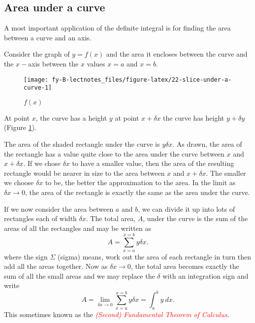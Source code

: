 \documentclass[
  11pt,
  oneside]{book}
\newcommand{\slide}{}
\theoremstyle{definition}
\theoremstyle{definition}
\theoremstyle{definition}
\theoremstyle{definition}
\theoremstyle{remark}
\begin{document}
\slide

\subsection{Area under a curve}\label{area-under-a-curve}

A most important application of the definite integral is for finding the area between a curve and an axis.

Consider the graph of \(y = f(x)\) and the area it encloses between the curve and the \(x-\)axis between the \(x\) values \(x = a\) and \(x = b\).

\begin{figure}

{\centering \texttt{[image: fy-B-lectnotes\_files/figure-latex/22-slice-under-a-curve-1]} 

}

\caption{$f(x)$}\label{fig:22-slice-under-a-curve}
\end{figure}

At point \(x\), the curve has a height \(y\) at point \(x + \delta x\) the curve has height \(y + \delta y\) (Figure \ref{fig:22-slice-under-a-curve}).

The area of the shaded rectangle under the curve is \(y\delta x\). As drawn, the area of the rectangle has a value quite close to the area under the curve between \(x\) and \(x + \delta x\). If we chose \(\delta x\) to have a smaller value, then the area of the resulting rectangle would be nearer in size to the area between \(x\) and \(x + \delta x\). The smaller we choose \(\delta x\) to be, the better the approximation to the area. In the limit as \(\delta x \to 0\), the area of the rectangle is exactly the same as the area under the curve.

\slide

If we now consider the area between \(a\) and \(b\), we can divide it up into lots of rectangles each of width \(\delta x\). The total area, \(A\), under the curve is the sum of the areas of all the rectangles and may be written as
\[
A=\sum_{x=a}^{x=b}y\delta x.
\]
where the sign \(\Sigma\) (sigma) means, work out the area of each rectangle in turn then add all the areas together. Now as \(\delta x \to 0\), the total area becomes exactly the sum of all the small areas and we may replace the \(\delta\) with an integration sign and write
\[
A =\lim\limits_{\delta x\to 0}\sum_{x=a}^{x=b}y\delta x = \int_a^b y\ dx.
\]
This sometimes known as the \textcolor{red}{\em (Second) Fundamental Theorem of Calculus}.
\slide
\end{document}
